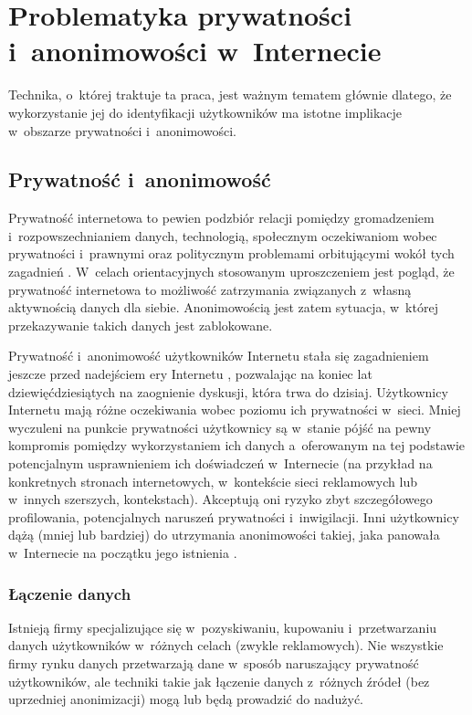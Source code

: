 \chapter{Problematyka prywatności i~anonimowości w~Internecie}
Technika, o~której traktuje ta praca, jest ważnym tematem głównie dlatego, że
wykorzystanie jej do identyfikacji użytkowników ma istotne implikacje w~obszarze
prywatności i~anonimowości.

\section{Prywatność i~anonimowość}
Prywatność internetowa to pewien podzbiór relacji pomiędzy gromadzeniem
i~rozpowszechnianiem danych, technologią, społecznym oczekiwaniom wobec
prywatności i~prawnymi oraz politycznym problemami orbitującymi wokół tych
zagadnień \cite{michael2013uberveillance}. W~celach orientacyjnych stosowanym
uproszczeniem jest pogląd, że prywatność internetowa to możliwość zatrzymania
związanych z~własną aktywnością danych dla siebie. Anonimowością jest zatem
sytuacja, w~której przekazywanie takich danych jest zablokowane.

Prywatność i~anonimowość użytkowników Internetu stała się zagadnieniem jeszcze
przed nadejściem ery Internetu \cite{david1965some}, pozwalając na koniec lat
dziewięćdziesiątych na zaognienie dyskusji, która trwa do dzisiaj. Użytkownicy
Internetu mają różne oczekiwania wobec poziomu ich prywatności w~sieci. Mniej
wyczuleni na punkcie prywatności użytkownicy są w~stanie pójść na pewny
kompromis pomiędzy wykorzystaniem ich danych a~oferowanym na tej podstawie
potencjalnym usprawnieniem ich doświadczeń w~Internecie (na przykład na
konkretnych stronach internetowych, w~kontekście sieci reklamowych lub w~innych
szerszych, kontekstach). Akceptują oni ryzyko zbyt szczegółowego profilowania,
potencjalnych naruszeń prywatności i~inwigilacji. Inni użytkownicy dążą (mniej
lub bardziej) do utrzymania anonimowości takiej, jaka panowała w~Internecie na
początku jego istnienia \cite[s. 54--69]{snowden2019pamiec}.

\subsection{Łączenie danych}
Istnieją firmy specjalizujące się w~pozyskiwaniu, kupowaniu i~przetwarzaniu
danych użytkowników w~różnych celach (zwykle reklamowych). Nie wszystkie firmy
rynku danych przetwarzają dane w~sposób naruszający prywatność użytkowników, ale
techniki takie jak łączenie danych z~różnych źródeł (bez uprzedniej
anonimizacji) mogą lub będą prowadzić do nadużyć.

